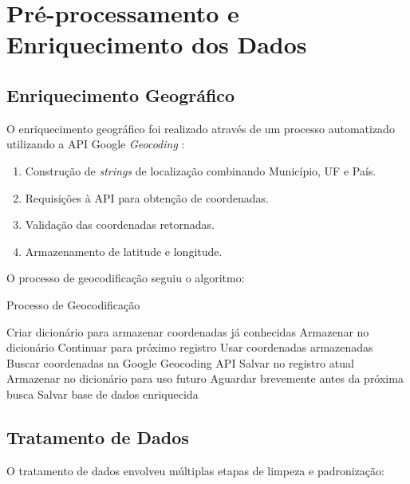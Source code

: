 \documentclass[conference]{IEEEtran}
\begin{document}
\section{Pré-processamento e Enriquecimento dos Dados}

\subsection{Enriquecimento Geográfico}
O enriquecimento geográfico foi realizado através de um processo automatizado utilizando a API Google \textit{Geocoding} \cite{b5}:

\begin{enumerate}
\item Construção de \textit{strings} de localização combinando Município, UF e País.
\item Requisições à API para obtenção de coordenadas.
\item Validação das coordenadas retornadas.
\item Armazenamento de latitude e longitude.
\end{enumerate}

O processo de geocodificação seguiu o algoritmo:

\begin{algorithm}
\caption{Processo de Geocodificação}
\begin{algorithmic}[1]
\STATE Criar dicionário para armazenar coordenadas já conhecidas
        \STATE Armazenar no dicionário
        \STATE Continuar para próximo registro
    \ENDIF
        \STATE Usar coordenadas armazenadas
    \ELSE
        \STATE Buscar coordenadas na Google Geocoding API
            \STATE Salvar no registro atual
            \STATE Armazenar no dicionário para uso futuro
        \ENDIF
        \STATE Aguardar brevemente antes da próxima busca
    \ENDIF
\ENDFOR
\STATE Salvar base de dados enriquecida
\end{algorithmic}
\end{algorithm}

\subsection{Tratamento de Dados}
O tratamento de dados envolveu múltiplas etapas de limpeza e padronização:
\end{document}
